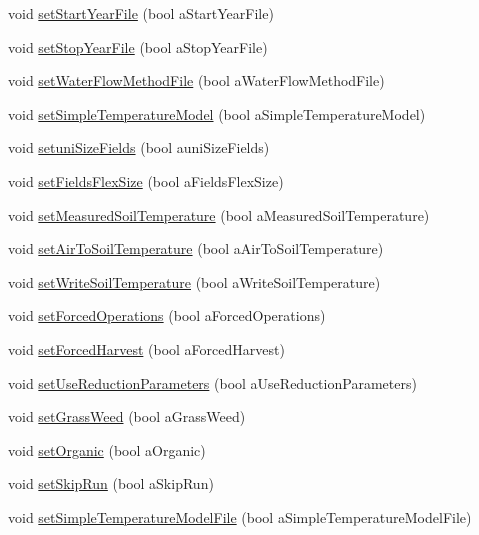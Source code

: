 \begin{DoxyCompactItemize}
void \hyperlink{classsystem_run_data_af9dedcbe88b86c0f219b2fa051741d3a}{setStartYearFile} (bool aStartYearFile)
\item 
void \hyperlink{classsystem_run_data_a673bf638a69369d131176b0a34085d4e}{setStopYearFile} (bool aStopYearFile)
\item 
void \hyperlink{classsystem_run_data_a4963e61ad97d6ee702e9e4f72cd0b85e}{setWaterFlowMethodFile} (bool aWaterFlowMethodFile)
\item 
void \hyperlink{classsystem_run_data_a7bf798f47dabdd0d438e18d69d3f0d9c}{setSimpleTemperatureModel} (bool aSimpleTemperatureModel)
\item 
void \hyperlink{classsystem_run_data_a77d5d36f7912b616de7d8e9407e400f7}{setuniSizeFields} (bool auniSizeFields)
\item 
void \hyperlink{classsystem_run_data_a32fdf06a096c486eba6694b53d35725b}{setFieldsFlexSize} (bool aFieldsFlexSize)
\item 
void \hyperlink{classsystem_run_data_a8f9ae87873668093ea6986afc56a8a62}{setMeasuredSoilTemperature} (bool aMeasuredSoilTemperature)
\item 
void \hyperlink{classsystem_run_data_a081c5ffbee752c4bd22ff6cbc62b8d28}{setAirToSoilTemperature} (bool aAirToSoilTemperature)
\item 
void \hyperlink{classsystem_run_data_ab7a375c89f501b059a04e5b2d2cbfb91}{setWriteSoilTemperature} (bool aWriteSoilTemperature)
\item 
void \hyperlink{classsystem_run_data_af3adb9907a5ce5634edbc3ada17c977a}{setForcedOperations} (bool aForcedOperations)
\item 
void \hyperlink{classsystem_run_data_aa9b8af6097b6b29afdad5a05b5f0cbc7}{setForcedHarvest} (bool aForcedHarvest)
\item 
void \hyperlink{classsystem_run_data_a517849010af7170de7125499a1c4805a}{setUseReductionParameters} (bool aUseReductionParameters)
\item 
void \hyperlink{classsystem_run_data_ad920f3c6680820f98e49237e4fd7240f}{setGrassWeed} (bool aGrassWeed)
\item 
void \hyperlink{classsystem_run_data_a346f825429eaaa8ee3a5f525a172ef11}{setOrganic} (bool aOrganic)
\item 
void \hyperlink{classsystem_run_data_adbdf196f200d4564afd78b226b7cebd3}{setSkipRun} (bool aSkipRun)
\item 
void \hyperlink{classsystem_run_data_a9c1740e87b52c0f3eb02f61435ffe7b6}{setSimpleTemperatureModelFile} (bool aSimpleTemperatureModelFile)
\item 

\end{DoxyCompactItemize}
